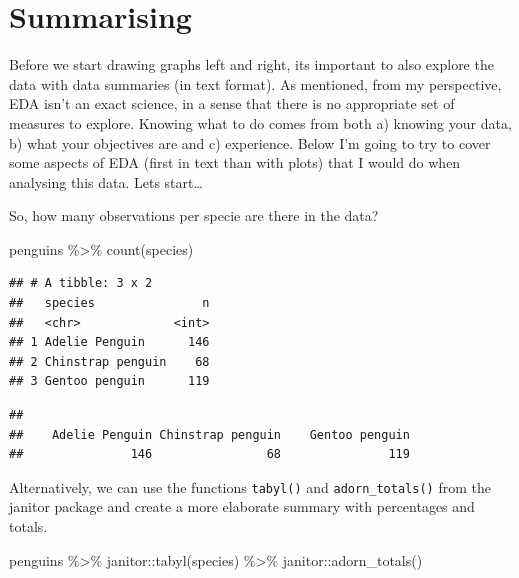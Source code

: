 \documentclass[
]{book}
\newenvironment{Shaded}{\begin{snugshade}}{\end{snugshade}}
\newcommand{\FunctionTok}[1]{\textcolor[rgb]{0.00,0.00,0.00}{#1}}
\newcommand{\NormalTok}[1]{#1}
\newcommand{\SpecialCharTok}[1]{\textcolor[rgb]{0.00,0.00,0.00}{#1}}
\begin{document}
\hypertarget{summarising}{%
\section{Summarising}\label{summarising}}

Before we start drawing graphs left and right, its important to also explore the data with data summaries (in text format).
As mentioned, from my perspective, EDA isn't an exact science, in a sense that there is no appropriate set of measures to explore.
Knowing what to do comes from both a) knowing your data, b) what your objectives are and c) experience.
Below I'm going to try to cover some aspects of EDA (first in text than with plots) that I would do when analysing this data.
Lets start\ldots{}

So, how many observations per specie are there in the data?

\begin{Shaded}
\begin{Highlighting}[]
\NormalTok{penguins }\SpecialCharTok{\%\textgreater{}\%} 
  \FunctionTok{count}\NormalTok{(species)}
\end{Highlighting}
\end{Shaded}

\begin{verbatim}
## # A tibble: 3 x 2
##   species               n
##   <chr>             <int>
## 1 Adelie Penguin      146
## 2 Chinstrap penguin    68
## 3 Gentoo penguin      119
\end{verbatim}

\begin{Shaded}
\end{Shaded}

\begin{verbatim}
## 
##    Adelie Penguin Chinstrap penguin    Gentoo penguin 
##               146                68               119
\end{verbatim}

Alternatively, we can use the functions \texttt{tabyl()} and \texttt{adorn\_totals()} from the janitor package and create a more elaborate summary with percentages and totals.

\begin{Shaded}
\begin{Highlighting}[]
\NormalTok{penguins }\SpecialCharTok{\%\textgreater{}\%} 
\NormalTok{  janitor}\SpecialCharTok{::}\FunctionTok{tabyl}\NormalTok{(species) }\SpecialCharTok{\%\textgreater{}\%} 
\NormalTok{  janitor}\SpecialCharTok{::}\FunctionTok{adorn\_totals}\NormalTok{()}
\end{Highlighting}
\end{Shaded}
\end{document}

